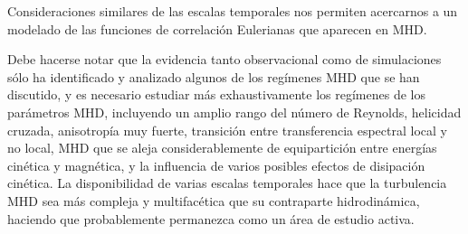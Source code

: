 Consideraciones similares de las escalas temporales nos permiten
acercarnos a un modelado de las funciones de correlación Eulerianas
que aparecen en MHD.

Debe hacerse notar que la evidencia tanto observacional como de
simulaciones sólo ha identificado y analizado algunos de los regímenes
MHD que se han discutido, y es necesario estudiar más exhaustivamente
los regímenes de los parámetros MHD, incluyendo un amplio rango del
número de Reynolds, helicidad cruzada, anisotropía muy fuerte,
transición entre transferencia espectral local y no local, MHD que se
aleja considerablemente de equipartición entre energías cinética y
magnética, y la influencia de varios posibles efectos de disipación
cinética. La disponibilidad de varias escalas temporales hace que la
turbulencia MHD sea más compleja y multifacética que su contraparte
hidrodinámica, haciendo que probablemente permanezca como un área de
estudio activa.
